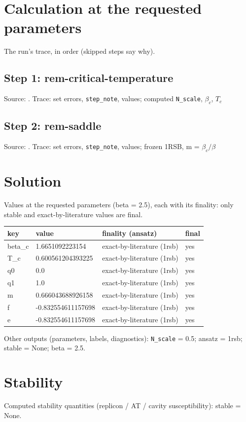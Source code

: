 \documentclass[11pt]{article}
\begin{document}
\section{Calculation at the requested parameters}
The run's trace, in order (skipped steps say why).
\subsection{Step 1: rem-critical-temperature}
Source: \cite{b1,b2}. Trace: set errors, \texttt{step\_note}, values; computed \texttt{N\_scale}, $\beta _{c}$, $T_{c}$

\subsection{Step 2: rem-saddle}
Source: \cite{b1,b2,b6}. Trace: set errors, \texttt{step\_note}, values; frozen 1RSB, m = $\beta _{c}/\beta$

\section{Solution}
Values at the requested parameters (beta = 2.5), each with its finality: only stable and exact-by-literature values are final.
\begin{center}
\begin{tabular}{llll}
key & value & finality (ansatz) & final \\
\hline
beta\_c & 1.6651092223154 & exact-by-literature (1rsb) \cite{b7,b2,b5} & yes \\
T\_c & 0.600561204393225 & exact-by-literature (1rsb) \cite{b7,b2,b5} & yes \\
q0 & 0.0 & exact-by-literature (1rsb) \cite{b7,b2,b5} & yes \\
q1 & 1.0 & exact-by-literature (1rsb) \cite{b7,b2,b5} & yes \\
m & 0.666043688926158 & exact-by-literature (1rsb) \cite{b7,b2,b5} & yes \\
f & -0.832554611157698 & exact-by-literature (1rsb) \cite{b7,b2,b5} & yes \\
e & -0.832554611157698 & exact-by-literature (1rsb) \cite{b7,b2,b5} & yes \\
\end{tabular}
\end{center}
Other outputs (parameters, labels, diagnostics): \texttt{N\_scale} = 0.5; ansatz = 1rsb; stable = None; beta = 2.5.

\section{Stability}
Computed stability quantities (replicon / AT / cavity susceptibility): stable = None.
\end{document}
